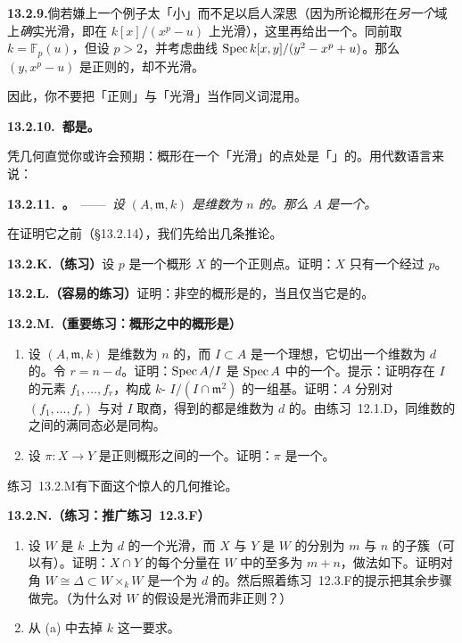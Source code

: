 \textbf{13.2.9.}\quad 倘若嫌上一个例子太「小」而不足以启人深思（因为所论概形在\emph{另一个}域上\emph{确}实光滑，即在 $k[x]/(x^p-u)$ 上光滑），这里再给出一个。同前取 $k=\mathbb{F}_p(u)$，但设 $p>2$，并考虑曲线 $\operatorname{Spec} k[x,y]/(y^2-x^p+u)$。那么\trClosedPoint{} $(y,x^p-u)$ 是正则的，却不光滑。

因此，你不要把「正则」与「光滑」当作同义词混用。

\textbf{13.2.10.\ \trRegular\trLocalRing{}都是\trIntegralDomain。}

凭几何直觉你或许会预期：概形在一个「光滑」的点处是「\trLocally\trIrreducible」的。用代数语言来说：

\textbf{13.2.11.\ \trhTheorem{}。}\ ——\ \emph{设 $(A,\mathfrak{m},k)$ 是维数为 $n$ 的\trRegular\trLocalRing。那么 $A$ 是一个\trIntegralDomain。}

在证明它之前（\S13.2.14），我们先给出几条推论。

\textbf{13.2.K.（练习）}\quad 设 $p$ 是一个\trLocally\trNoetherian{}概形 $X$ 的一个正则点。证明：$X$ 只有一个\trIrreducibleComponent{}经过 $p$。

\textbf{13.2.L.（容易的练习）}\quad 证明：非空的\trRegular\trNoetherian{}概形是\trIrreducible{}的，当且仅当它是\trConnected{}的。

\textbf{13.2.M.（重要练习：\trRegular{}概形之中的\trRegular{}概形是\trRegularEmbedding）}
\begin{enumerate}[label=(\alph*)]
\item 设 $(A,\mathfrak{m},k)$ 是维数为 $n$ 的\trRegular\trLocalRing，而 $I\subset A$ 是一个理想，它切出一个维数为 $d$ 的\trRegular\trLocalRing。令 $r=n-d$。证明：$\operatorname{Spec} A/I$ 是 $\operatorname{Spec} A$ 中的一个\trRegularEmbedding。提示：证明存在 $I$ 的元素 $f_1,\dots,f_r$，构成 $k$-\trVectorSpace{} $I/(I\cap\mathfrak{m}^2)$ 的一组基。证明：$A$ 分别对 $(f_1,\dots,f_r)$ 与对 $I$ 取商，得到的都是维数为 $d$ 的\trRegular\trLocalRing。由\mbox{练习~12.1.D}，同维数的\trIntegralDomain{}之间的满同态必是同构。
\item 设 $\pi\colon X\to Y$ 是正则概形之间的一个\trClosedEmbedding。证明：$\pi$ 是一个\trRegularEmbedding。
\end{enumerate}

\mbox{练习~13.2.M}有下面这个惊人的几何推论。

\textbf{13.2.N.（练习：推广\mbox{练习~12.3.F}）}
\begin{enumerate}[label=(\alph*)]
\item 设 $W$ 是\trAlgClosedField{} $k$ 上\trPureDimension{}为 $d$ 的一个光滑\trVariety，而 $X$ 与 $Y$ 是 $W$ 的\trCodimension{}分别为 $m$ 与 $n$ 的\trPureDimensional{}子簇（可以有\trSingularPoint）。证明：$X\cap Y$ 的每个分量在 $W$ 中的\trCodimension{}至多为 $m+n$，做法如下。证明对角 $W\cong\Delta\subset W\times_k W$ 是一个\trCodimension{}为 $d$ 的\trRegularEmbedding。然后照着\mbox{练习~12.3.F}的提示把其余步骤做完。（为什么对 $W$ 的假设是光滑而非正则？）
\item 从 (a) 中去掉 $k$ \trAlgClosed{}这一要求。
\end{enumerate}

